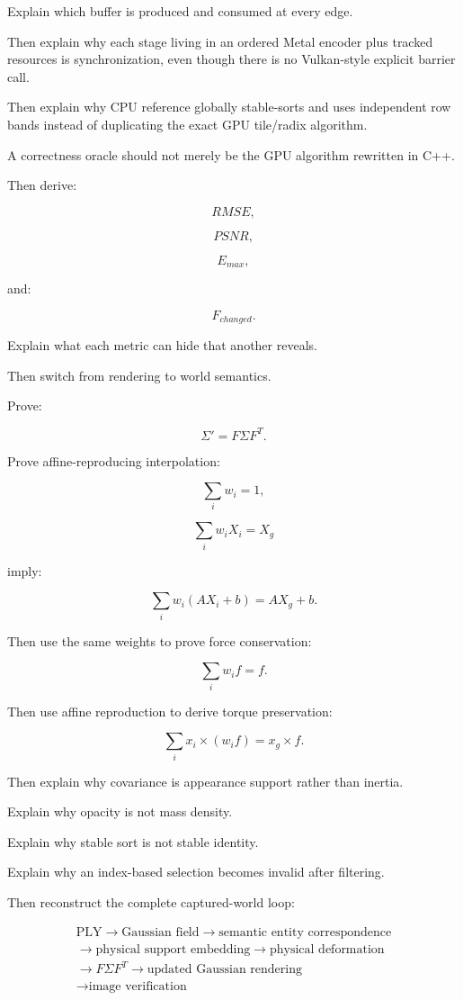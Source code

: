 Explain which buffer is produced and consumed at every edge.

Then explain why each stage living in an ordered Metal encoder plus tracked resources is synchronization, even though there is no Vulkan-style explicit barrier call.

Then explain why CPU reference globally stable-sorts and uses independent row bands instead of duplicating the exact GPU tile/radix algorithm.

A correctness oracle should not merely be the GPU algorithm rewritten in C++.

Then derive:

\[
RMSE,
\]

\[
PSNR,
\]

\[
E_{max},
\]

and:

\[
F_{changed}.
\]

Explain what each metric can hide that another reveals.

Then switch from rendering to world semantics.

Prove:

\[
\Sigma'
=
F\Sigma F^T.
\]

Prove affine-reproducing interpolation:

\[
\sum_iw_i=1,
\]

\[
\sum_iw_iX_i=X_g
\]

imply:

\[
\sum_iw_i(AX_i+b)
=
AX_g+b.
\]

Then use the same weights to prove force conservation:

\[
\sum_iw_if=f.
\]

Then use affine reproduction to derive torque preservation:

\[
\sum_i
x_i\times(w_if)
=
x_g\times f.
\]

Then explain why covariance is appearance support rather than inertia.

Explain why opacity is not mass density.

Explain why stable sort is not stable identity.

Explain why an index-based selection becomes invalid after filtering.

Then reconstruct the complete captured-world loop:

\[\boxed{\begin{gathered}\text{PLY}\rightarrow\text{Gaussian field}\rightarrow\text{semantic entity correspondence}\\\rightarrow\text{physical support embedding}\rightarrow\text{physical deformation}\\\rightarrow F\Sigma F^T\rightarrow\text{updated Gaussian rendering}\\\rightarrow\text{image verification}\end{gathered}}\]

